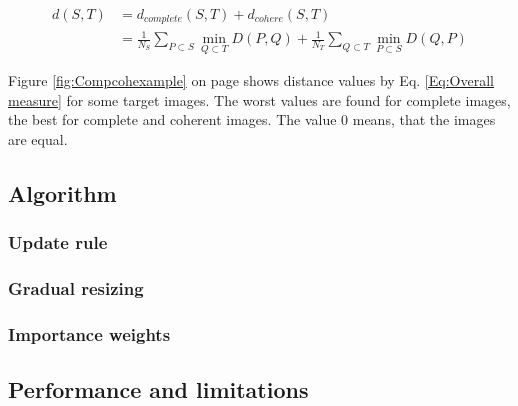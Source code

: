 \large
\begin{align}
\label{Eq:Overall measure}
d(S,T)&=d_{complete}(S,T)+d_{cohere}(S,T) \nonumber \\
&=\frac{1}{N_{S}}\sum_{P \subset S} \min\limits_{Q \subset T} D(P,Q)+\frac{1}{N_{T}}\sum_{Q \subset T} \min\limits_{P \subset S} D(Q,P)
\end{align}
\normalsize

Figure \ref{fig:Compcohexample} on page \pageref{fig:Compcohexample} shows distance values by Eq. \ref{Eq:Overall measure} for some target images. The worst values are found for complete images, the best for complete and coherent images. The value 0 means, that the images are equal.

\subsection{Algorithm}
\subsubsection{Update rule}
\subsubsection{Gradual resizing}
\subsubsection{Importance weights}
\subsection{Performance and limitations}